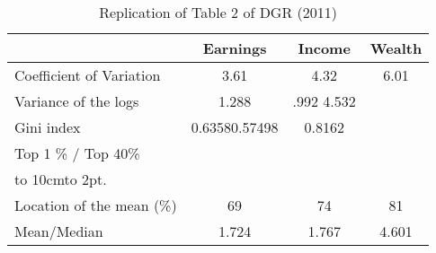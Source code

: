 \documentclass[12pt]{article}%
\def\dotfill#1{\cleaders\hbox to #1{.}\hfill}
\newcommand\dotline[2][.5em]{\leavevmode\hbox to #2{\dotfill{#1}\hfil}}
\begin{document}
\begin{enumerate}
	\begin {table}[H]
\footnotesize
\begin{center}
	\caption {Replication of Table 2 of DGR (2011)}
	\label{tab:Table2}
	{
		\begin{tabular}{l*{3}{c}}
			\hline
			&  Earnings&Income&Wealth\\
			\hline
			Coefficient of Variation &  3.61 &   4.32 &  6.01\\
			Variance of the logs  &1.288 & .992 4.532	 \\
			Gini index & 0.63580.57498&0.8162\\
			Top 1 \% /  Top 40\%&&&\\
			\multicolumn{4}{l}{\dotline[2pt]{10cm}} \\
			Location of the mean (\%) &69&74&81\\
			Mean/Median & 1.724 &	1.767 & 4.601\\
			\hline
		\end{tabular}
	}	
	
\end{center} 
\end {table}
	
	\vspace{3mm}
	
\end{enumerate}

\strut

\onehalfspacing
\end{document}
